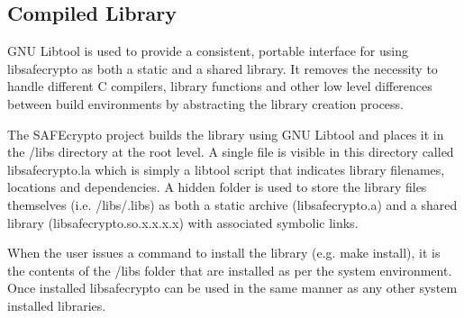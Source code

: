 \subsection{Compiled Library}

GNU Libtool is used to provide a consistent, portable interface for using libsafecrypto as both a static and a shared library. It removes the necessity to handle different C compilers, library functions and other low level differences between build environments by abstracting the library creation process.

The SAFEcrypto project builds the library using GNU Libtool and places it in the /libs directory at the root level. A single file is visible in this directory called libsafecrypto.la which is simply a libtool script that indicates library filenames, locations and dependencies. A hidden folder is used to store the library files themselves (i.e. /libs/.libs) as both a static archive (libsafecrypto.a) and a shared library (libsafecrypto.so.x.x.x.x) with associated symbolic links.

When the user issues a command to install the library (e.g. make install), it is the contents of the /libs folder that are installed as per the system environment. Once installed libsafecrypto can be used in the same manner as any other system installed libraries.

